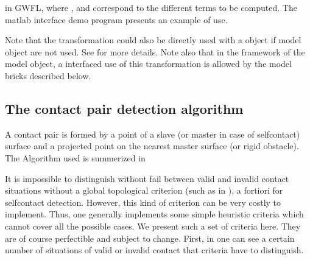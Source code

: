 \documentclass[a4paper,11pt,english]{sphinxmanual}
\begin{document}
\begin{sphinxVerbatim}[commandchars=\\\{\}]
  
  
  
\end{sphinxVerbatim}

in GWFL, where ,  and  correspond to the different terms to be computed. The matlab interface demo program  presents an example of use.

Note that the transformation could also be directly used with a  object if model object are not used. See  for more details. Note also that in the framework of the model object, a interfaced use of this transformation is allowed by the model bricks described below.


\subsection{The contact pair detection algorithm}
\label{\detokenize{userdoc/model_contact_friction_large_sliding:the-contact-pair-detection-algorithm}}
A contact pair is formed by a point of a slave (or master in case of self\sphinxhyphen{}contact) surface and a projected point on the nearest master surface (or rigid obstacle). The Algorithm used is summerized in {\hyperref[\detokenize{userdoc/model_contact_friction_large_sliding:ud-fig-algodetect}]{}}

\begin{figure}[htbp]
\centering

\noindent{}
\end{figure}

It is impossible to distinguish without fail between valid and invalid contact situations without a global topological criterion (such as in ), a fortiori for self\sphinxhyphen{}contact detection. However, this kind of criterion can be very costly to implement. Thus, one generally implements some simple heuristic criteria which cannot cover all the possible cases. We present such a set of criteria here. They are of course perfectible and subject to change. First, in {\hyperref[\detokenize{userdoc/model_contact_friction_large_sliding:ud-fig-invalidcontact}]{}} one can see a certain number of situations of valid or invalid contact that criteria have to distinguish.
\end{document}
